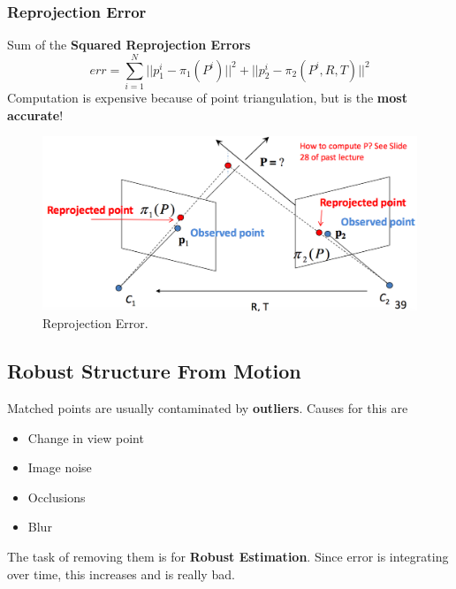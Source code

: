 \documentclass[a4paper,12 pt]{article}
\theoremstyle{definition}
\theoremstyle{remark}
\theoremstyle{definition}
\theoremstyle{definition}
\theoremstyle{definition}
\theoremstyle{remark}
\theoremstyle{definition}
\begin{document}
\subsubsection*{Reprojection Error}
Sum of the \textbf{Squared Reprojection Errors}
\begin{equation}
err=\sum_{i=1}^N ||p_1^i-\pi_1(P^i)||^2+||p_2^i-\pi_2(P^i,R,T)||^2
\end{equation}
Computation is expensive because of point triangulation, but is the \textbf{most accurate}!
\begin{figure}[h!]
\begin{center}
\includegraphics[scale=0.3]{pics/repro}
\caption{Reprojection Error. \label{fig:repro}}
\end{center}
\end{figure}
\subsection*{Robust Structure From Motion}
Matched points are usually contaminated by \textbf{outliers}. Causes for this are
\begin{itemize}
\item Change in view point
\item Image noise
\item Occlusions
\item Blur
\end{itemize}
The task of removing them is for \textbf{Robust Estimation}. Since error is integrating over time, this increases and is really bad.
\end{document}
